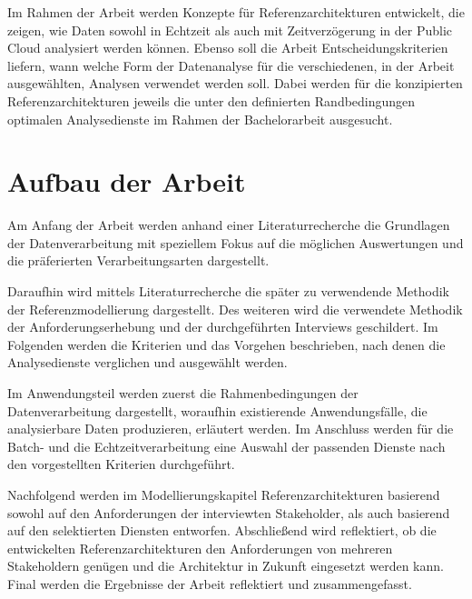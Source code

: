 Im Rahmen der Arbeit werden Konzepte für Referenzarchitekturen entwickelt, die zeigen, wie Daten sowohl in Echtzeit als auch mit Zeitverzögerung in der Public Cloud analysiert werden können. 
Ebenso soll die Arbeit Entscheidungskriterien liefern, wann welche Form der Datenanalyse für die verschiedenen, in der Arbeit ausgewählten, Analysen verwendet werden soll. 
Dabei werden für die konzipierten Referenzarchitekturen jeweils die unter den definierten Randbedingungen optimalen Analysedienste im Rahmen der Bachelorarbeit ausgesucht.

\section{Aufbau der Arbeit}\label{section:Aufbau-der-Arbei}

Am Anfang der Arbeit werden anhand einer Literaturrecherche die Grundlagen der Datenverarbeitung mit speziellem Fokus auf die möglichen Auswertungen und die präferierten Verarbeitungsarten dargestellt. 

Daraufhin wird mittels Literaturrecherche die später zu verwendende Methodik der Referenzmodellierung dargestellt. 
Des weiteren wird die verwendete Methodik der Anforderungserhebung und der durchgeführten Interviews geschildert. 
Im Folgenden werden die Kriterien und das Vorgehen beschrieben, nach denen die Analysedienste verglichen und ausgewählt werden. 

Im Anwendungsteil werden zuerst die Rahmenbedingungen der Datenverarbeitung dargestellt, woraufhin existierende Anwendungsfälle, die analysierbare Daten produzieren, erläutert werden. 
Im Anschluss werden für die Batch- und die Echtzeitverarbeitung eine Auswahl der passenden Dienste nach den vorgestellten Kriterien durchgeführt. 

Nachfolgend werden im Modellierungskapitel Referenzarchitekturen basierend sowohl auf den Anforderungen der interviewten Stakeholder, als auch basierend auf den selektierten Diensten entworfen. Abschließend wird reflektiert, ob die entwickelten Referenzarchitekturen den Anforderungen von mehreren Stakeholdern genügen und die Architektur in Zukunft eingesetzt werden kann. Final werden die Ergebnisse der Arbeit reflektiert und zusammengefasst.

